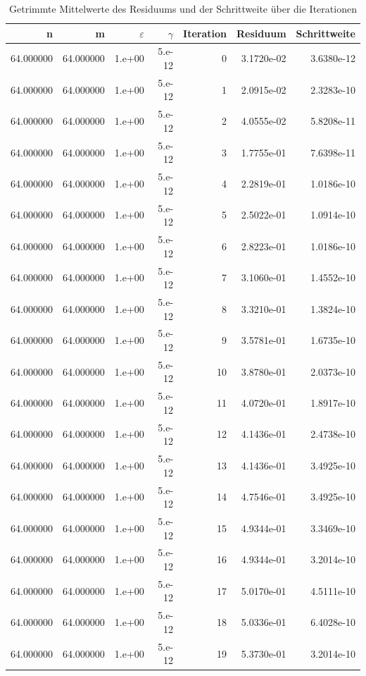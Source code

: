 \begin{table}[htbp]
\caption{Getrimmte Mittelwerte des Residuums und der Schrittweite über die Iterationen}
\label{tab:Konvergenztest}
\small
\centering
{}
\begin{tabular}{rrrrrrr}
\toprule
n & m & $\varepsilon$ & $\gamma$ & Iteration & Residuum & Schrittweite \\
\midrule
64.000000 & 64.000000 & 1.e+00 & 5.e-12 & 0 & 3.1720e-02 & 3.6380e-12 \\
64.000000 & 64.000000 & 1.e+00 & 5.e-12 & 1 & 2.0915e-02 & 2.3283e-10 \\
64.000000 & 64.000000 & 1.e+00 & 5.e-12 & 2 & 4.0555e-02 & 5.8208e-11 \\
64.000000 & 64.000000 & 1.e+00 & 5.e-12 & 3 & 1.7755e-01 & 7.6398e-11 \\
64.000000 & 64.000000 & 1.e+00 & 5.e-12 & 4 & 2.2819e-01 & 1.0186e-10 \\
64.000000 & 64.000000 & 1.e+00 & 5.e-12 & 5 & 2.5022e-01 & 1.0914e-10 \\
64.000000 & 64.000000 & 1.e+00 & 5.e-12 & 6 & 2.8223e-01 & 1.0186e-10 \\
64.000000 & 64.000000 & 1.e+00 & 5.e-12 & 7 & 3.1060e-01 & 1.4552e-10 \\
64.000000 & 64.000000 & 1.e+00 & 5.e-12 & 8 & 3.3210e-01 & 1.3824e-10 \\
64.000000 & 64.000000 & 1.e+00 & 5.e-12 & 9 & 3.5781e-01 & 1.6735e-10 \\
64.000000 & 64.000000 & 1.e+00 & 5.e-12 & 10 & 3.8780e-01 & 2.0373e-10 \\
64.000000 & 64.000000 & 1.e+00 & 5.e-12 & 11 & 4.0720e-01 & 1.8917e-10 \\
64.000000 & 64.000000 & 1.e+00 & 5.e-12 & 12 & 4.1436e-01 & 2.4738e-10 \\
64.000000 & 64.000000 & 1.e+00 & 5.e-12 & 13 & 4.1436e-01 & 3.4925e-10 \\
64.000000 & 64.000000 & 1.e+00 & 5.e-12 & 14 & 4.7546e-01 & 3.4925e-10 \\
64.000000 & 64.000000 & 1.e+00 & 5.e-12 & 15 & 4.9344e-01 & 3.3469e-10 \\
64.000000 & 64.000000 & 1.e+00 & 5.e-12 & 16 & 4.9344e-01 & 3.2014e-10 \\
64.000000 & 64.000000 & 1.e+00 & 5.e-12 & 17 & 5.0170e-01 & 4.5111e-10 \\
64.000000 & 64.000000 & 1.e+00 & 5.e-12 & 18 & 5.0336e-01 & 6.4028e-10 \\
64.000000 & 64.000000 & 1.e+00 & 5.e-12 & 19 & 5.3730e-01 & 3.2014e-10 \\

\end{tabular}
\end{table}
